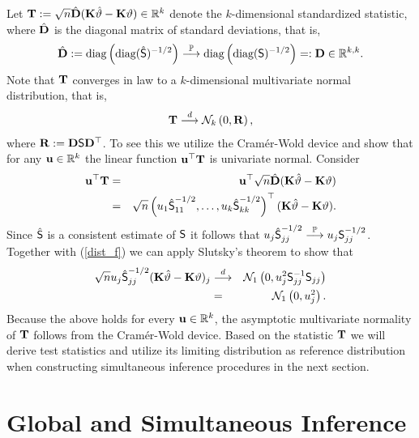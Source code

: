 \documentclass[12pt]{article}
\begin{document}
Let $\T := \sqrt{n} \hat{\D} (\K \hat{\vartheta} - \K \vartheta) \in \R^k$ denote
the $k$-dimensional standardized statistic, where $\hat{\D}$ is the diagonal
matrix of standard deviations, that is,
\begin{eqnarray*}
\hat{\D} := \text{diag}\left(\text{diag}(\hat{\S})^{-1/2}\right) \cP
\text{diag}\left(\text{diag}(\S)^{-1/2}\right) =: \D \in \R^{k,k}.
\end{eqnarray*}
Note that $\T$ converges in law to a $k$-dimensional multivariate
normal distribution, that is,
\begin{eqnarray*}
\T \cL \N_k\left(0, \Cor\right),
\end{eqnarray*}
where $ \Cor := \D \S \D^\top$. To see this we utilize the
Cram{\'e}r-Wold device \citep[e.g., Theorem 5.1.8
in][]{Lehmann1999} and show that for any $\uu \in \R^k$
the linear function $\uu^\top \T$ is univariate normal. Consider
\begin{eqnarray*}
\uu^\top \T & = & \uu^\top \sqrt{n} \hat{\D} (\K \hat{\vartheta} - \K \vartheta) \\
& = & \sqrt{n} \left(u_1 \hat{\S}_{11}^{-1/2}, \dots, u_k \hat{\S}_{kk}^{-1/2}\right)^\top(\K \hat{\vartheta} -
\K \vartheta).
\end{eqnarray*}
Since $\hat{\S}$ is a consistent estimate of $\S$ it
follows that $u_j \hat{\S}_{jj}^{-1/2} \cP u_j \S_{jj}^{-1/2}$.
Together with (\ref{dist_f}) we can apply Slutsky's theorem \citep[Theorem 2.3.3
in][]{Lehmann1999} to show that
\begin{eqnarray*}
\sqrt{n} u_j \hat{\S}_{jj}^{-1/2} (\K \hat{\vartheta} - \K \vartheta)_j & \cL &
\N_1\left(0, u_j^2 \S_{jj}^{-1} \S_{jj}\right) \\
& = & \N_1\left(0, u_j^2\right).
\end{eqnarray*}
Because the above holds for every $\uu \in \R^k$, the asymptotic multivariate
normality of $\T$ follows from the Cram{\'e}r-Wold device. 
Based on the statistic $\T$ we will derive test statistics 
and utilize its limiting distribution
as reference distribution when constructing
simultaneous inference procedures in the next section.

\section{Global and Simultaneous Inference} \label{siminf}
\end{document}
